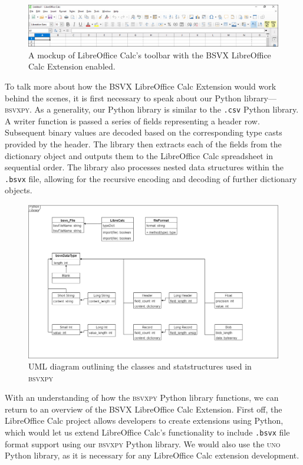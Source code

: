 \documentclass[10pt]{article}
\begin{document}
\begin{figure}[H]
\centering
\includegraphics[width=\textwidth]{figures/mockupPart3.png}
\caption{A mockup of LibreOffice Calc's toolbar with the BSVX LibreOffice Calc Extension enabled.}
\label{fig:deliverables_mockupPart3}
\end{figure}

\indent{}
To talk more about how the BSVX LibreOffice Calc Extension would work behind the scenes, it is first necessary to speak about our Python library---\textsc{bsvxpy}.
As a generality, our Python library is similar to the \texttt{.csv} Python library.
A writer function is passed a series of fields representing a header row. 
Subsequent binary values are decoded based on the corresponding type casts provided by the header.
The library then extracts each of the fields from the dictionary object and outputs them to the LibreOffice Calc spreadsheet in sequential order.
The library also processes nested data structures within the \texttt{.bsvx} file, allowing for the recursive encoding and decoding of further dictionary objects.

\begin{figure}[H]
\centering
\includegraphics[width=\textwidth]{figures/bsvxpy.png}
\caption{UML diagram outlining the classes and statstructures used in \textsc{bsvxpy}}
\label{fig:bsvxpy_architecture}
\end{figure}

\indent{}
With an understanding of how the \textsc{bsvxpy} Python library functions, we can return to an overview of the BSVX LibreOffice Calc Extension.
First off, the LibreOffice Calc project allows developers to create extensions using Python, which would let us extend LibreOffice Calc’s functionality to include \texttt{.bsvx} file format support using our \textsc{bsvxpy} Python library.
We would also use the \textsc{uno} Python library, as it is necessary for any LibreOffice Calc extension development.
\end{document}

